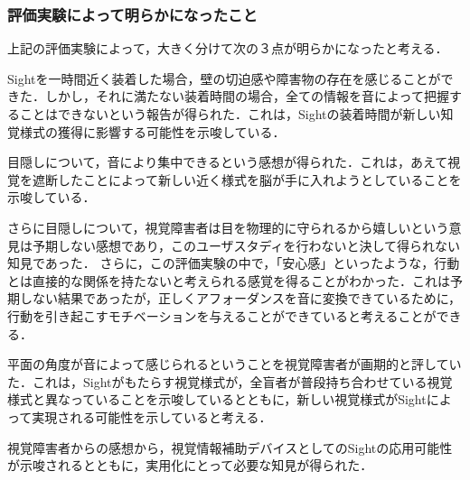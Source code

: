 \subsubsection{評価実験によって明らかになったこと}
上記の評価実験によって，大きく分けて次の３点が明らかになったと考える．

Sightを一時間近く装着した場合，壁の切迫感や障害物の存在を感じることができた．しかし，それに満たない装着時間の場合，全ての情報を音によって把握することはできないという報告が得られた．これは，Sightの装着時間が新しい知覚様式の獲得に影響する可能性を示唆している．

目隠しについて，音により集中できるという感想が得られた．これは，あえて視覚を遮断したことによって新しい近く様式を脳が手に入れようとしていることを示唆している．

さらに目隠しについて，視覚障害者は目を物理的に守られるから嬉しいという意見は予期しない感想であり，このユーザスタディを行わないと決して得られない知見であった．
さらに，この評価実験の中で，「安心感」といったような，行動とは直接的な関係を持たないと考えられる感覚を得ることがわかった．これは予期しない結果であったが，正しくアフォーダンスを音に変換できているために，行動を引き起こすモチベーションを与えることができていると考えることができる．

平面の角度が音によって感じられるということを視覚障害者が画期的と評していた．これは，Sightがもたらす視覚様式が，全盲者が普段持ち合わせている視覚様式と異なっていることを示唆しているとともに，新しい視覚様式がSightによって実現される可能性を示していると考える．

視覚障害者からの感想から，視覚情報補助デバイスとしてのSightの応用可能性が示唆されるとともに，実用化にとって必要な知見が得られた．